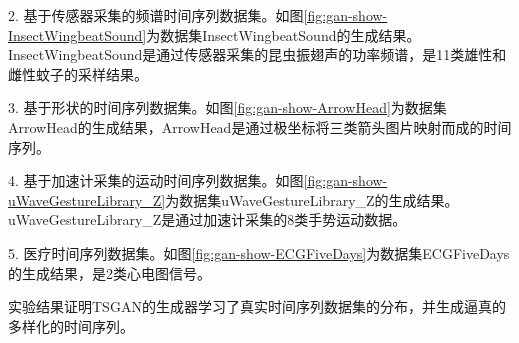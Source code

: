 2. 基于传感器采集的频谱时间序列数据集。如图\ref{fig:gan-show-InsectWingbeatSound}为数据集InsectWingbeatSound的生成结果。InsectWingbeatSound是通过传感器采集的昆虫振翅声的功率频谱，是11类雄性和雌性蚊子的采样结果。

3. 基于形状的时间序列数据集。如图\ref{fig:gan-show-ArrowHead}为数据集ArrowHead的生成结果，ArrowHead是通过极坐标将三类箭头图片映射而成的时间序列。

4. 基于加速计采集的运动时间序列数据集。如图\ref{fig:gan-show-uWaveGestureLibrary_Z}为数据集uWaveGestureLibrary\_Z的生成结果。uWaveGestureLibrary\_Z是通过加速计采集的8类手势运动数据。

5. 医疗时间序列数据集。如图\ref{fig:gan-show-ECGFiveDays}为数据集ECGFiveDays的生成结果，是2类心电图信号。

实验结果证明TSGAN的生成器学习了真实时间序列数据集的分布，并生成逼真的多样化的时间序列。

